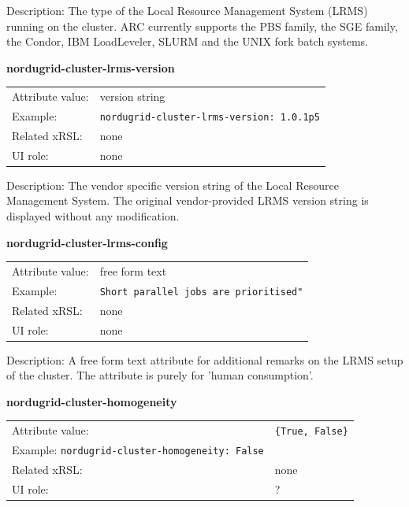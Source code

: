 \documentclass{article}
\begin{document}
Description:  The type of the Local Resource Management System (LRMS) running on the cluster.
ARC currently supports the PBS family, the SGE family, the Condor, IBM LoadLeveler, SLURM and the UNIX fork 
batch systems.


  \hspace*{0.5cm}
  \begin{shaded}
    \textbf{nordugrid-cluster-lrms-version}
  \end{shaded}
  \begin{tabular}{lp{10cm}}  
    Attribute value:& version string\\
    Example:& \verb#nordugrid-cluster-lrms-version: 1.0.1p5#\\
    Related xRSL:& none\\
    UI role:& none \\
  \end{tabular}

Description: The vendor specific version string of the Local Resource Management System.
The original vendor-provided LRMS version string is displayed without any modification.


  \hspace*{0.5cm}
  \begin{shaded}
    \textbf{nordugrid-cluster-lrms-config}
  \end{shaded}
  \begin{tabular}{lp{10cm}}  
    Attribute value:& free form text\\
    Example:& \verb#Short parallel jobs are prioritised"#\\
    Related xRSL:& none\\
    UI role:& none\\
  \end{tabular}

Description: A free form text attribute for additional remarks on the LRMS setup of the 
cluster. The attribute is purely for 'human consumption'.


  \hspace*{0.5cm}
  \begin{shaded}
    \textbf{nordugrid-cluster-homogeneity}
  \end{shaded}
  \begin{tabular}{lp{10cm}}  
    Attribute value:& \verb#{True, False}#\\
    Example: \verb#nordugrid-cluster-homogeneity: False#\\    
    Related xRSL:& none\\
    UI role:& ?\\
  \end{tabular}
\end{document}
